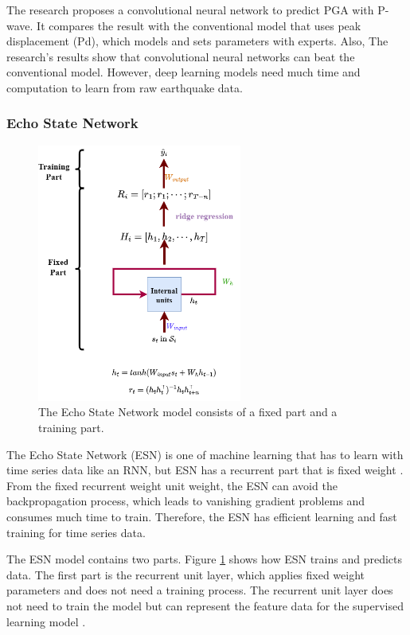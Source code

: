 The research \cite{chiang2022neural} proposes a convolutional neural network to predict PGA with P-wave. It compares the result with the conventional model that uses peak displacement (Pd), which models and sets parameters with experts. Also, The research's results show that convolutional neural networks can beat the conventional model. However, deep learning models need much time and computation to learn from raw earthquake data.

\subsubsection{Echo State Network}
\begin{figure}[ht]
    \centering
    \includegraphics[width=0.6\textwidth]{img/Echo_new.png}
    \caption{The Echo State Network model consists of a fixed part and a training part.}
    \label{fig:Echo-model}
\end{figure}

The Echo State Network (ESN) is one of machine learning that has to learn with time series data like an RNN, but ESN has a recurrent part that is fixed weight \cite{cucchi2022hands}. From the fixed recurrent weight unit weight, the ESN can avoid the backpropagation process, which leads to vanishing gradient problems and consumes much time to train. Therefore, the ESN has efficient learning and fast training for time series data\cite{bianchi2020reservoir}.

The ESN model contains two parts. Figure \ref{fig:Echo-model} shows how ESN trains and predicts data. The first part is the recurrent unit layer, which applies fixed weight parameters and does not need a training process. The recurrent unit layer does not need to train the model but can represent the feature data for the supervised learning model \cite{cucchi2022hands, bianchi2020reservoir}.

